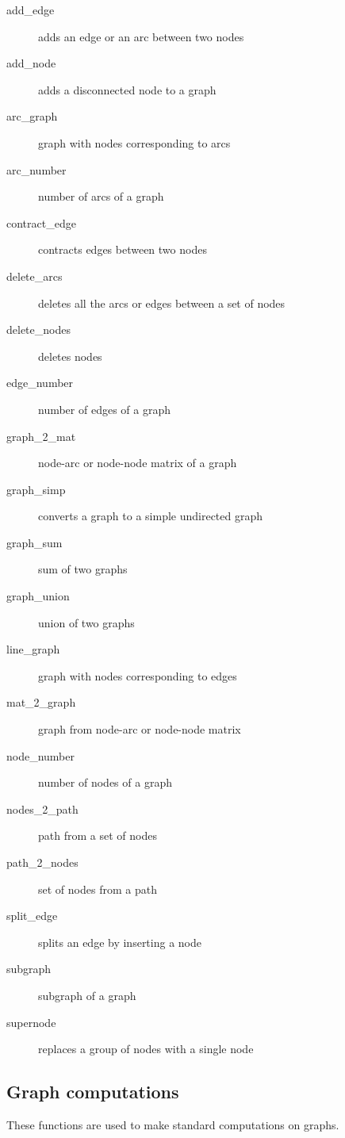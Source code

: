 \documentclass[11pt]{article}
\begin{document}
\begin{description}
\item[add\_edge] adds an edge or an arc between two nodes
\item[add\_node] adds a disconnected node to a graph
\item[arc\_graph] graph with nodes corresponding to arcs
\item[arc\_number] number of arcs of a graph
\item[contract\_edge] contracts edges between two nodes
\item[delete\_arcs] deletes all the arcs or edges between a set of nodes
\item[delete\_nodes] deletes nodes
\item[edge\_number] number of edges of a graph
\item[graph\_2\_mat] node-arc or node-node matrix of a graph
\item[graph\_simp] converts a graph to a simple undirected graph
\item[graph\_sum] sum of two graphs
\item[graph\_union] union of two graphs
\item[line\_graph] graph with nodes corresponding to edges
\item[mat\_2\_graph] graph from node-arc or node-node matrix
\item[node\_number] number of nodes of a graph
\item[nodes\_2\_path] path from a set of nodes
\item[path\_2\_nodes] set of nodes from a path
\item[split\_edge] splits an edge by inserting a node
\item[subgraph] subgraph of a graph 
\item[supernode] replaces a group of nodes with a single node
\end{description}

\subsection{Graph computations}

These functions are used to make standard computations on graphs.
\end{document}

